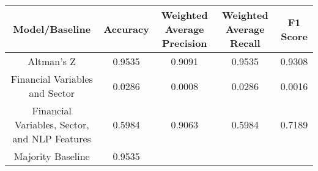 \footnotesize
\begin{tabular}{ccccc}
\toprule
Model/Baseline & Accuracy & Weighted Average Precision & Weighted Average Recall & F1 Score \\
\midrule
Altman's Z & 0.9535 & 0.9091 & 0.9535 & 0.9308 \\
Financial Variables and Sector & 0.0286 & 0.0008 & 0.0286 & 0.0016 \\
Financial Variables, Sector, and NLP Features & 0.5984 & 0.9063 & 0.5984 & 0.7189 \\
Majority Baseline & 0.9535 &  &  &  \\
\bottomrule
\end{tabular}

\normalsize